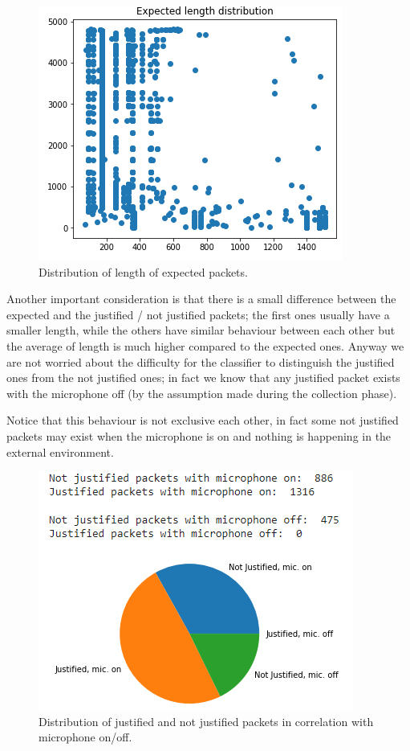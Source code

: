 \documentclass[sigconf]{acmart}
\begin{document}
    \begin{figure}[h!]
        \includegraphics[width=0.8\linewidth]{img/expected_distribution.png}
        \caption{Distribution of length of expected packets.}
        \label{fig:expected_distribution}
    \end{figure}

    Another important consideration is that there is a small difference between the expected and the justified / not justified packets; the first ones usually have a smaller length, while the others have similar behaviour between each other but the average of length is much higher compared to the expected ones.
    Anyway we are not worried about the difficulty for the classifier to distinguish the justified ones from the not justified ones; in fact we know that any justified packet exists with the microphone off (by the assumption made during the collection phase).

    Notice that this behaviour is not exclusive each other, in fact some not justified packets may exist when the microphone is on and nothing is happening in the external environment.
    \begin{figure}[h!]
        \includegraphics[width=0.8\linewidth]{img/justified_not_justified.png}
        \caption{Distribution of justified and not justified packets in correlation with microphone on/off.}
        \label{fig:justified_not_justified}
    \end{figure}
\end{document}
